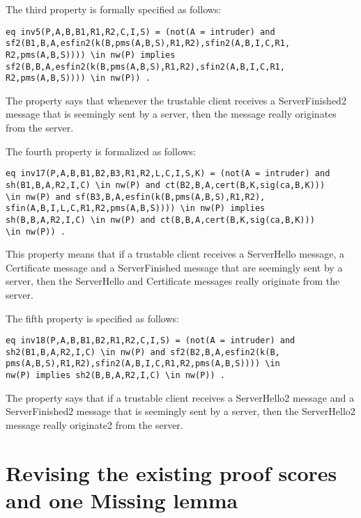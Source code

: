 \documentclass[a4paper,fleqn]{cas-dc}
\begin{document}
The third property is formally specified as follows:
\begin{verbatim}
eq inv5(P,A,B,B1,R1,R2,C,I,S) = (not(A = intruder) and
sf2(B1,B,A,esfin2(k(B,pms(A,B,S),R1,R2),sfin2(A,B,I,C,R1,
R2,pms(A,B,S)))) \in nw(P) implies
sf2(B,B,A,esfin2(k(B,pms(A,B,S),R1,R2),sfin2(A,B,I,C,R1,
R2,pms(A,B,S)))) \in nw(P)) .
\end{verbatim}
The property says that whenever the trustable client receives a ServerFinished2 message that is seemingly sent by a server, then the message really originates from the server.  

The fourth property is formalized as follows:
\begin{small}
\begin{verbatim}
eq inv17(P,A,B,B1,B2,B3,R1,R2,L,C,I,S,K) = (not(A = intruder) and
sh(B1,B,A,R2,I,C) \in nw(P) and ct(B2,B,A,cert(B,K,sig(ca,B,K)))
\in nw(P) and sf(B3,B,A,esfin(k(B,pms(A,B,S),R1,R2),
sfin(A,B,I,L,C,R1,R2,pms(A,B,S)))) \in nw(P) implies
sh(B,B,A,R2,I,C) \in nw(P) and ct(B,B,A,cert(B,K,sig(ca,B,K))) 
\in nw(P)) .
\end{verbatim}
\end{small}
This property means that if a trustable client receives a ServerHello message, a Certificate message and a ServerFinished message that are seemingly sent by a server, then the ServerHello and Certificate messages really originate from the server.

The fifth property is specified as follows:
\begin{verbatim}
eq inv18(P,A,B,B1,B2,R1,R2,C,I,S) = (not(A = intruder) and 
sh2(B1,B,A,R2,I,C) \in nw(P) and sf2(B2,B,A,esfin2(k(B,
pms(A,B,S),R1,R2),sfin2(A,B,I,C,R1,R2,pms(A,B,S)))) \in 
nw(P) implies sh2(B,B,A,R2,I,C) \in nw(P)) .
\end{verbatim}
The property says that if a trustable client receives a ServerHello2 message and
a ServerFinished2 message that is seemingly sent by a server, then the ServerHello2
message really originate2 from the server.


\section{Revising the existing proof scores and one Missing lemma}
\label{revision}
\end{document}
